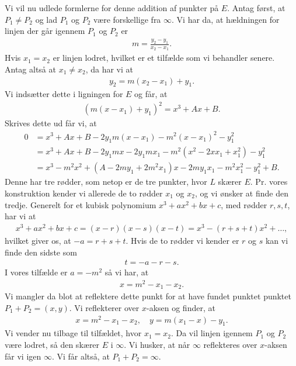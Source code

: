 Vi vil nu udlede formlerne for denne addition af punkter på $E$. Antag først, at $P_1 \neq P_2$ og lad $P_1$ og $P_2$ være forskellige fra $\infty$. Vi har da, at hældningen for linjen der går igennem $P_1$ og $P_2$ er
\begin{align*}
	m = \frac{y_2 - y_1}{x_2 - x_1}.
\end{align*}
Hvis $x_1 = x_2$ er linjen lodret, hvilket er et tilfælde som vi behandler senere. Antag altså at $x_1 \neq x_2$, da har vi at
\begin{align*}
	y_2 = m(x_2 - x_1) + y_1.
\end{align*}
Vi indsætter dette i ligningen for $E$ og får, at 
\begin{align*}
	(m(x-x_1) + y_1)^2 = x^3 + Ax + B.
\end{align*}
Skrives dette ud får vi, at
\begin{align*}
	0 &= x^3 + Ax + B - 2y_1 m(x-x_1) - m^2 (x - x_1)^2 - y_{1}^{2} \\
	&= x^3 + Ax + B - 2y_1 m x - 2y_1 m x_1 - m^2 (x^2 -2x x_1 + x_{1}^{2}) - y_{1}^{2} \\
	&= x^3 - m^2 x^2 + (A-2my_1 +2m^2x_1)x -2m y_1 x_1 -m^2 x_{1}^{2} - y_{1}^{2} + B. 
\end{align*}
Denne har tre rødder, som netop er de tre punkter, hvor $L$ skærer $E$.
Pr. vores konstruktion kender vi allerede de to rødder $x_1$ og $x_2$,
og vi ønsker at finde den tredje. Generelt for et kubisk polynomium 
$x^3 + ax^2 + bx + c$, med rødder $r, s, t$, har vi at 
\begin{align*}
	x^3 + ax^2 + bx + c = (x - r)(x - s)(x - t) = x^3 - (r + s + t)x^2 + \ldots,
\end{align*}
hvilket giver os, at $-a = r + s + t$. Hvis de to rødder vi kender er $r$ og $s$
kan vi finde den sidste som
\begin{align*}
	t = -a - r - s.
\end{align*}
I vores tilfælde er $a=-m^2$ så vi har, at 
\begin{align*}
	x = m^2 - x_1 - x_2.
\end{align*}
Vi mangler da blot at reflektere dette punkt for at have fundet punktet 
punktet $P_1 + P_2=(x, y)$. Vi reflekterer over $x$-aksen og finder, at 
\begin{align*}
	x = m^2 - x_1 - x_2, \quad y = m(x_1 - x) - y_1.
\end{align*}
Vi vender nu tilbage til tilfældet, hvor $x_1 = x_2$. Da vil linjen igennem 
$P_1$ og $P_2$ være lodret, så den skærer $E$ i $\infty$. Vi husker, at når $\infty$ 
reflekteres over $x$-aksen får vi igen $\infty$. Vi får altså, at $P_1 + P_2=\infty$.

